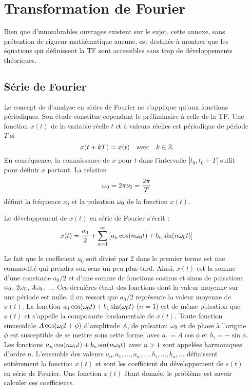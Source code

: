 \chapter{Transformation de Fourier}
\label{chap:fourier}

Bien que d'innombrables ouvrages existent sur le sujet, cette annexe,
sans prétention de rigueur mathématique aucune, est destinée à montrer
que les équations qui définissent la TF sont accessibles sans trop de
développements théoriques.

\section{Série de Fourier}
Le concept de d'analyse en séries de Fourier ne s'applique qu'aux fonctions
périodiques.
Son étude constitue cependant le préliminaire à celle de la TF.
Une fonction $x(t)$ de la variable réelle $t$ et à valeurs réelles
est périodique de période $T$ si
\begin{equation}
x(t+kT) = x(t) \quad \mbox{avec} \quad k \in \mathbb{Z}
\end{equation}
En conséquence, la connaissance de $x$ pour $t$ dans l'intervalle $[t_0, t_0+T[$
suffit pour définir $x$ partout.
La relation
\begin{equation}
\omega_0 = 2\pi\nu_0 = \frac{2\pi}{T}
\end{equation}
définit la fréquence $\nu_0$ et la pulsation $\omega_0$ de la fonction $x(t)$.

Le développement de $x(t)$ en série de Fourier s'écrit :
\begin{equation}
\label{eqn:serfourdef}
x(t) = \frac{a_0}{2}+\sum_{n=1}^{\infty}
\left[a_n \cos(n\omega_0 t) + b_n \sin(n\omega_0 t) \right]
\end{equation}

Le fait que le coefficient $a_0$ soit divisé par 2 dans le premier terme
est une commodité qui prendra son sens un peu plus tard.
Ainsi, $x(t)$ est la somme d'une constante $a_0/2$ et d'une somme de fonctions
cosinus et sinus de pulsations $\omega_0$, $2\omega_0$, $3\omega_0$, $\ldots$.
Ces dernières étant des fonctions dont la valeur moyenne sur une période est nulle,
il en ressort que $a_0/2$ représente la valeur moyenne de $x(t)$.
La fonction $a_1 \cos(\omega_0 t) + b_1 \sin(\omega_0 t)$ ($n=1$) est de même
pulsation que $x(t)$ et s'appelle la composante fondamentale de $x(t)$.
Toute fonction sinusoïdale $A\cos(\omega_0 t+\phi)$ d'amplitude $A$, de pulsation
$\omega_0$ et de phase à l'origine $\phi$ est susceptible de se mettre sous cette forme,
avec $a_1 = A \cos\phi$ et $b_1 = -\sin\phi$.
Les fonctions $a_n \cos(n\omega_0 t) + b_n \sin(n\omega_0 t)$ avec $n>1$ sont appelées harmoniques
d'ordre $n$.
L'ensemble des valeurs $a_0, a_1, \ldots, a_n, \ldots, b_1, \ldots, b_n, \ldots$
définissent entièrement la fonction $x(t)$ et sont les coefficient du
développement de $s(t)$ en série de Fourier.
Une fonction $x(t)$ étant donnée, le problème est savoir calculer ces coefficients.

